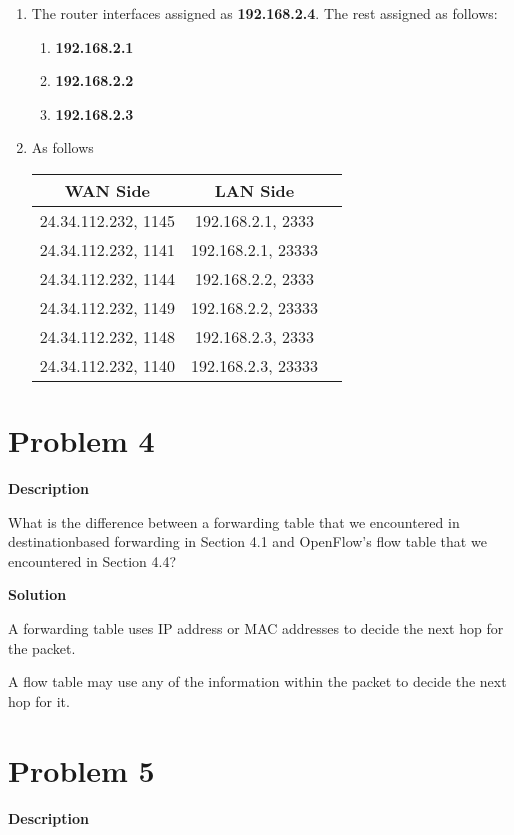 \documentclass[12pt,letterpaper]{ctexart}
\begin{document}
\begin{enumerate}
  \item The router interfaces assigned as \textbf{192.168.2.4}. The rest assigned as follows:
  \begin{enumerate}
    \item \textbf{192.168.2.1}
    \item \textbf{192.168.2.2}
    \item \textbf{192.168.2.3}
  \end{enumerate}
  \item As follows
  \begin{table}[htbp]
    \small
    \centering
    \begin{tabular}{|c|c|c|}
    \hline
        WAN Side        &      LAN Side     \\ \hline
    24.34.112.232, 1145 & 192.168.2.1, 2333 \\ \hline
    24.34.112.232, 1141 & 192.168.2.1, 23333 \\ \hline
    24.34.112.232, 1144 & 192.168.2.2, 2333 \\ \hline
    24.34.112.232, 1149 & 192.168.2.2, 23333 \\ \hline
    24.34.112.232, 1148 & 192.168.2.3, 2333 \\ \hline
    24.34.112.232, 1140 & 192.168.2.3, 23333 \\ \hline
    \end{tabular}
  \end{table}


\end{enumerate}
\newpage

\section*{Problem 4}
{\bf Description}

What is the difference between a forwarding table that we encountered in destinationbased forwarding in Section 4.1 and OpenFlow's flow table that we encountered in Section 4.4?

{\bf Solution}

A forwarding table uses IP address or MAC addresses to decide the next hop for the packet.

A flow table may use any of the information within the packet to decide the next hop for it.


\section*{Problem 5}
{\bf Description}
\end{document}
